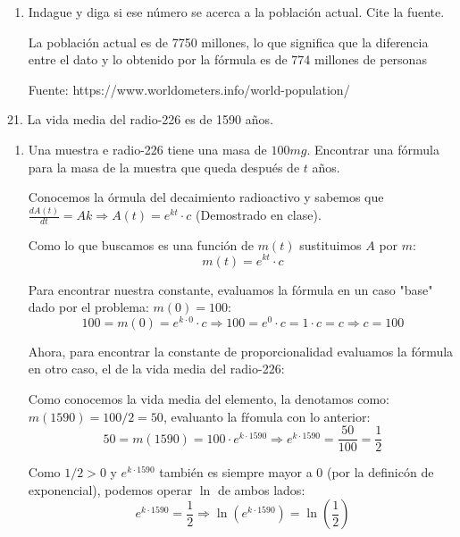 \documentclass[12pt]{article}
\begin{document}
\begin{enumerate}[\hspace{9px} a)]
    \item Indague y diga si ese número se acerca a la población actual. Cite la fuente.\medskip
    
        La poblaci\'on actual es de 7750 millones, lo que significa que la diferencia entre el dato y lo obtenido por la f\'ormula es de 774 millones de personas \medskip
        
        Fuente: https://www.worldometers.info/world-population/\medskip

\end{enumerate}

21. La vida media del radio-226 es de 1590 años.

\begin{enumerate}[\hspace{9px} a)]
    \item Una muestra e radio-226 tiene una masa de $100mg$. Encontrar una fórmula para la masa de la muestra que queda después de $t$ años.\medskip
    
        Conocemos la \'ormula del decaimiento radioactivo y sabemos que \(\displaystyle\frac{dA(t)}{dt}=Ak \Longrightarrow A(t) = e^{kt}\cdot c\) (Demostrado en clase).\medskip

        Como lo que buscamos es una funci\'on de $m(t)$ sustituimos $A$ por $m$:
        \[m(t)=e^{kt}\cdot c\]

        Para encontrar nuestra constante, evaluamos la f\'ormula en un caso "base" dado por el problema: \(m(0)=100\):
        \[100=m(0)=e^{k\cdot0}\cdot c \Longrightarrow 100=e^0\cdot c=1\cdot c=c \Longrightarrow c=100\]

        Ahora, para encontrar la constante de proporcionalidad evaluamos la f\'ormula en otro caso, el de la vida media del radio-226: 
        
        Como conocemos la vida media del elemento, la denotamos como: \(m(1590)=100/2=50\), evaluanto la f\'romula con lo anterior:
        \begin{equation*}
            50=m(1590)=100\cdot e^{k\cdot1590} \Longrightarrow e^{k\cdot1590}=\frac{50}{100}=\frac{1}{2}
        \end{equation*}

        Como \(1/2>0\) y \(e^{k\cdot1590}\) tambi\'en es siempre mayor a 0 (por la definic\'on de exponencial), podemos operar $\ln$ de ambos lados:
        \begin{equation*}
            e^{k\cdot1590}=\frac{1}{2} \Longrightarrow \ln\left(e^{k\cdot1590}\right)=\ln\left(\frac{1}{2}\right)
        \end{equation*}


\end{enumerate}
\end{document}

